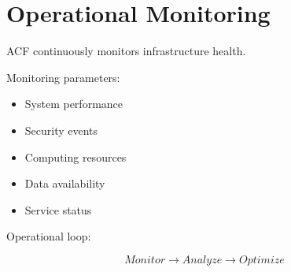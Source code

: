 \section{Operational Monitoring}


ACF continuously monitors infrastructure health.



Monitoring parameters:


\begin{itemize}

\item System performance

\item Security events

\item Computing resources

\item Data availability

\item Service status

\end{itemize}



Operational loop:


\[
Monitor
\rightarrow
Analyze
\rightarrow
Optimize
\]

